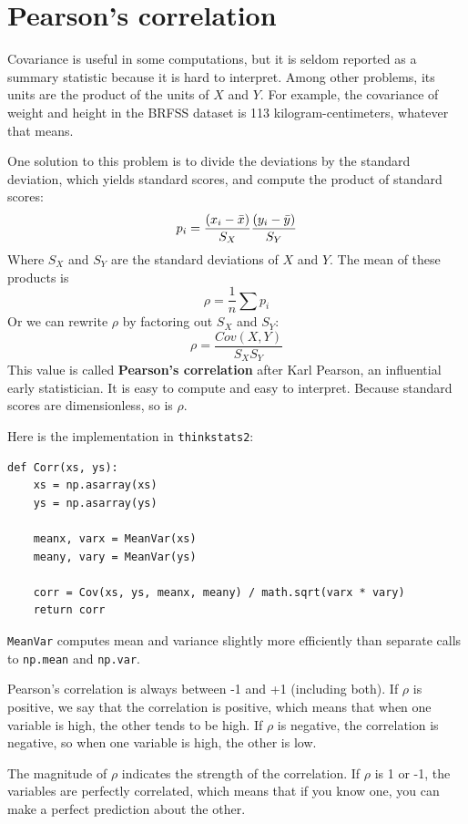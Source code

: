 \documentclass[12pt]{book}
\begin{document}
\section{Pearson's correlation}

Covariance is useful in some computations, but it is seldom reported
as a summary statistic because it is hard to interpret.  Among other
problems, its units are the product of the units of $X$ and $Y$.  For
example, the covariance of weight and height in the BRFSS dataset is
113 kilogram-centimeters, whatever that means.

One solution to this problem is to divide the deviations by the standard
deviation, which yields standard scores, and compute the product of
standard scores:
%
\[ p_i = \frac{(x_i - \bar{x})}{S_X} \frac{(y_i - \bar{y})}{S_Y} \]
%
Where $S_X$ and $S_Y$ are the standard deviations of $X$ and $Y$.
The mean of these products is
%
\[ \rho = \frac{1}{n} \sum p_i \]
%
Or we can rewrite $\rho$ by factoring out $S_X$ and
$S_Y$:
%
\[ \rho = \frac{Cov(X,Y)}{S_X S_Y} \]
%
This value is called {\bf Pearson's correlation} after Karl Pearson,
an influential early statistician.  It is easy to compute and easy to
interpret.  Because standard scores are dimensionless, so is $\rho$.

Here is the implementation in {\tt thinkstats2}:

\begin{verbatim}
def Corr(xs, ys):
    xs = np.asarray(xs)
    ys = np.asarray(ys)

    meanx, varx = MeanVar(xs)
    meany, vary = MeanVar(ys)

    corr = Cov(xs, ys, meanx, meany) / math.sqrt(varx * vary)
    return corr
\end{verbatim}

{\tt MeanVar} computes mean and variance slightly more efficiently
than separate calls to {\tt np.mean} and {\tt np.var}.

Pearson's correlation is always between -1 and +1 (including both).
If $\rho$ is positive, we say that the correlation is positive,
which means that when one variable is high, the other tends to be
high.  If $\rho$ is negative, the correlation is negative, so
when one variable is high, the other is low.

The magnitude of $\rho$ indicates the strength of the correlation.  If
$\rho$ is 1 or -1, the variables are perfectly correlated, which means
that if you know one, you can make a perfect prediction about the
other.  
\end{document}
